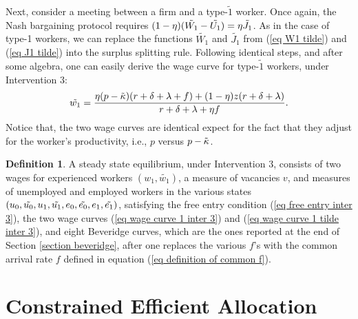 \documentclass[12pt]{article} %
\theoremstyle{definition}
\newtheorem{definition}{Definition}%
\begin{document}
Next, consider a meeting between a firm and a type-$\tilde{1}$ worker. Once again, the Nash bargaining protocol requires $(1-\eta)(\Tilde{W_1}-\Tilde{U_1}) = \eta \Tilde{J_1}$. As in the case of type-1 workers, we can replace the functions $\tilde{W_1}$ and $\tilde{J_1}$ from (\ref{eq W1 tilde}) and (\ref{eq J1 tilde}) into the surplus splitting rule. Following identical steps, and after some algebra, one can easily derive the wage curve for type-$\tilde{1}$ workers, under Intervention 3: 
\begin{equation}
\Tilde{w_1} = \frac{\eta (p-\Tilde{\kappa}) (r+\delta+\lambda+f)+(1-\eta)z(r+\delta+\lambda)}{r+\delta +\lambda+ \eta f}.\label{eq wage curve 1 tilde inter 3}
\end{equation}Notice that, the two wage curves are identical expect for the fact that they adjust for the worker's productivity, i.e., $p$ versus $p-\Tilde{\kappa}$. 

\bigskip 

\begin{definition}\label{definition equil inter 3}
A steady state equilibrium, under Intervention 3, consists of two wages for experienced workers $(w_1, \tilde{w_1})$, a measure of vacancies $v$, and measures of unemployed and employed workers in the various states $(u_0, \Tilde{u_0}, u_1, \Tilde{u_1}, e_0, \Tilde{e_0}, e_1, \Tilde{e_1})$, satisfying the free entry condition (\ref{eq free entry inter 3}), the two wage curves (\ref{eq wage curve 1 inter 3}) and (\ref{eq wage curve 1 tilde inter 3}), and eight Beveridge curves, which are the ones reported at the end of Section \ref{section beveridge}, after one replaces the various $f$'s with the common arrival rate $f$ defined in equation (\ref{eq definition of common f}). 
\end{definition} 


\iffalse

\section{Constrained Efficient Allocation}\label{section planner} 
\end{document}
